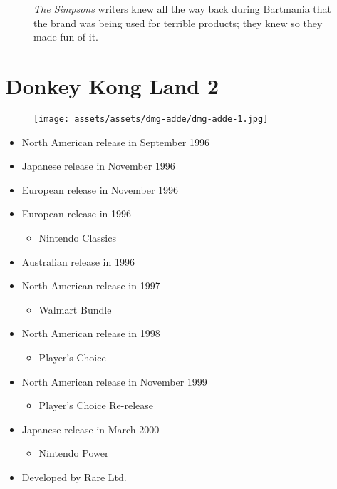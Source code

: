\documentclass{book}
\begin{document}
\FloatBarrier\vspace{\baselineskip}\begin{figure}[H]\caption*{\emph{The Simpsons} writers knew all the way back during Bartmania that the brand was being used for terrible products; they knew so they made fun of it.}\end{figure}
\chapter*{Donkey Kong Land 2}
\vspace{\baselineskip}\begin{figure}[H]{\texttt{[image: assets/assets/dmg-adde/dmg-adde-1.jpg]}}\end{figure}\vspace{\baselineskip}
\begin{itemize}[left=0pt, nosep]
\item North American release in September 1996
\item Japanese release in November 1996
\item European release in November 1996
\item European release in 1996
\begin{itemize}
\item Nintendo Classics
\end{itemize}
\item Australian release in 1996
\item North American release in 1997
\begin{itemize}
\item Walmart Bundle
\end{itemize}
\item North American release in 1998
\begin{itemize}
\item Player’s Choice
\end{itemize}
\item North American release in November 1999
\begin{itemize}
\item Player’s Choice Re-release
\end{itemize}
\item Japanese release in March 2000
\begin{itemize}
\item Nintendo Power
\end{itemize}
\item Developed by Rare Ltd.

\end{itemize}
\end{document}
